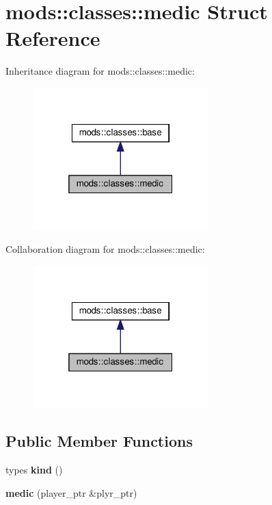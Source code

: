 \hypertarget{structmods_1_1classes_1_1medic}{}\section{mods\+:\+:classes\+:\+:medic Struct Reference}
\label{structmods_1_1classes_1_1medic}


Inheritance diagram for mods\+:\+:classes\+:\+:medic\+:
\nopagebreak
\begin{figure}[H]
\begin{center}
\leavevmode
\includegraphics[width=193pt]{structmods_1_1classes_1_1medic__inherit__graph}
\end{center}
\end{figure}


Collaboration diagram for mods\+:\+:classes\+:\+:medic\+:
\nopagebreak
\begin{figure}[H]
\begin{center}
\leavevmode
\includegraphics[width=193pt]{structmods_1_1classes_1_1medic__coll__graph}
\end{center}
\end{figure}
\subsection*{Public Member Functions}
\begin{DoxyCompactItemize}
\item 
\mbox{\label{structmods_1_1classes_1_1medic_af9d320c276d3bee3a07bff14340e8810}} 
types {\bfseries kind} ()
\item 
\mbox{\label{structmods_1_1classes_1_1medic_a18aa862e17d8d35ae73ebefd171e0117}} 
{\bfseries medic} (player\+\_\+ptr \&plyr\+\_\+ptr)
\end{DoxyCompactItemize}
